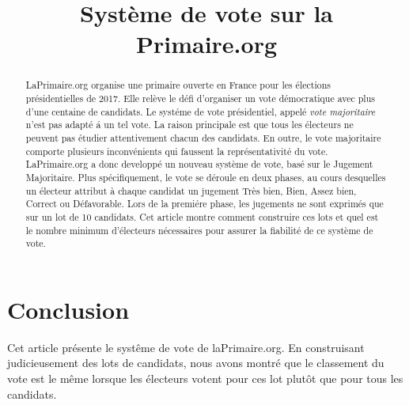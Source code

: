 \documentclass[conference]{IEEEtran}
\title{Syst\`eme de vote sur la Primaire.org}
\author{
    \IEEEauthorblockN{Pierre-Louis Guhur, Thibauld Favre}
}
\newcommand*{\rootPath}{./}
\begin{document}
  
  
\maketitle


\begin{abstract} 
LaPrimaire.org organise une primaire ouverte en France pour les \'elections pr\'esidentielles de 2017. Elle rel\`eve le d\'efi d'organiser un vote d\'emocratique avec plus d'une centaine de candidats. Le syst\'eme de vote pr\'esidentiel, appel\'e \emph{vote majoritaire} n'est pas adapt\'e \'a un tel vote. La raison principale est que tous les \'electeurs ne peuvent pas \'etudier attentivement chacun des candidats. En outre, le vote majoritaire comporte plusieurs inconv\'enients qui faussent la repr\'esentativit\'e du vote. LaPrimaire.org a donc developp\'e un nouveau syst\`eme de vote, bas\'e sur le Jugement Majoritaire. Plus sp\'ecifiquement, le vote se d\'eroule en deux phases, au cours desquelles un \'electeur attribut \`a chaque candidat un jugement Tr\`es bien, Bien, Assez bien, Correct ou D\'efavorable. Lors de la premi\'ere phase, les jugements ne sont exprim\'es que sur un lot de 10 candidats. Cet article montre comment construire ces lots et quel est le nombre minimum d'\'electeurs n\'ecessaires pour assurer la fiabilit\'e de ce syst\`eme de vote.
\end{abstract}











\section{Conclusion}

Cet article pr\'esente le syst\^eme de vote de laPrimaire.org. En construisant judicieusement des lots de candidats, nous avons montr\'e que le classement du vote est le m\^eme lorsque les \'electeurs votent pour ces lot plut\^ot que pour tous les candidats. 





\ifstandalone
	
	
\fi
\end{document}
